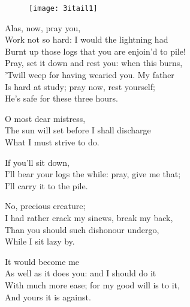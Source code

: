 \begin{figure}[tb]
\centering
\texttt{[image: 3itail1]}
\end{figure}




\begin{verse_speech}[Miranda] 
Alas, now, pray you,\\
Work not so hard: I would the lightning had\\
Burnt up those logs that you are enjoin'd to pile!\\
Pray, set it down and rest you: when this burns,\\
'Twill weep for having wearied you. My father\\
Is hard at study; pray now, rest yourself;\\
He's safe for these three hours.
\end{verse_speech}

\begin{verse_speech}[Ferdinand] 
O most dear mistress,\\
The sun will set before I shall discharge\\
What I must strive to do.
\end{verse_speech}

\begin{verse_speech}[Miranda] 
If you'll sit down,\\
I'll bear your logs the while: pray, give me that;\\
I'll carry it to the pile.
\end{verse_speech}

\begin{verse_speech}[Ferdinand] 
No, precious creature;\\
I had rather crack my sinews, break my back,\\
Than you should such dishonour undergo,\\
While I sit lazy by.
\end{verse_speech}

\begin{verse_speech}[Miranda] 
It would become me\\
As well as it does you: and I should do it\\
With much more ease; for my good will is to it,\\
And yours it is against.
\end{verse_speech}

